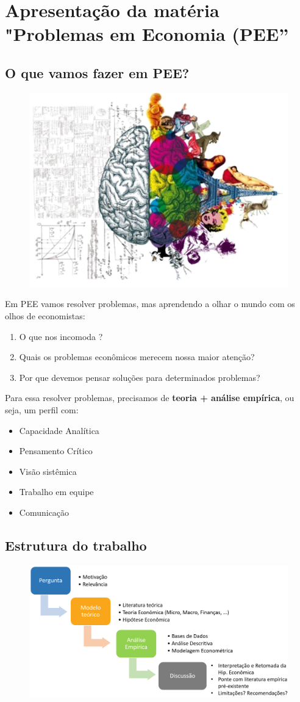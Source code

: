 \documentclass[a4paper,12pt]{article}[abnt2]
\begin{document}
\section{\textbf{Apresentação da matéria "Problemas em Economia (PEE''}}
\subsection{\textbf{O que vamos fazer em PEE?}}
\begin{figure}[H]
    \centering
    \includegraphics[width=0.5\linewidth]{Imagens/a1i1.png}
\end{figure}

Em PEE vamos resolver problemas, mas aprendendo a olhar o mundo com os olhos de economistas:\begin{enumerate}
    \item O que nos incomoda ?
    \item Quais os problemas econômicos merecem nossa maior atenção?
    \item Por que devemos pensar soluções para determinados problemas?
\end{enumerate} 

Para essa resolver problemas, precisamos de \textbf{teoria + análise empírica}, ou seja, um perfil com:\begin{itemize}
    \item Capacidade Analítica
    \item Pensamento Crítico
    \item Visão sistêmica
    \item Trabalho em equipe
    \item Comunicação
\end{itemize}

\subsection{\textbf{Estrutura do trabalho}}
\begin{figure}[H]
    \centering
    \includegraphics[width=0.75\linewidth]{Imagens/a1i2.png}
\end{figure}
\end{document}
